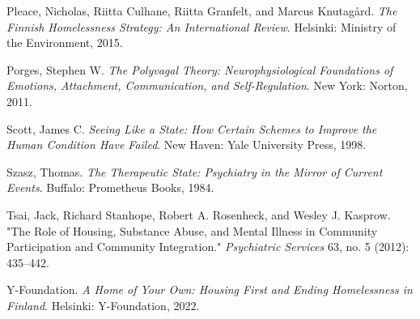 \documentclass[12pt, letterpaper]{article}
\begin{document}
Pleace, Nicholas, Riitta Culhane, Riitta Granfelt, and Marcus Knutagård. \textit{The Finnish Homelessness Strategy: An International Review}. Helsinki: Ministry of the Environment, 2015.

Porges, Stephen W. \textit{The Polyvagal Theory: Neurophysiological Foundations of Emotions, Attachment, Communication, and Self-Regulation}. New York: Norton, 2011.

Scott, James C. \textit{Seeing Like a State: How Certain Schemes to Improve the Human Condition Have Failed}. New Haven: Yale University Press, 1998.

Szasz, Thomas. \textit{The Therapeutic State: Psychiatry in the Mirror of Current Events}. Buffalo: Prometheus Books, 1984.

Tsai, Jack, Richard Stanhope, Robert A. Rosenheck, and Wesley J. Kasprow. "The Role of Housing, Substance Abuse, and Mental Illness in Community Participation and Community Integration." \textit{Psychiatric Services} 63, no. 5 (2012): 435–442.

Y-Foundation. \textit{A Home of Your Own: Housing First and Ending Homelessness in Finland}. Helsinki: Y-Foundation, 2022.
\end{document}
